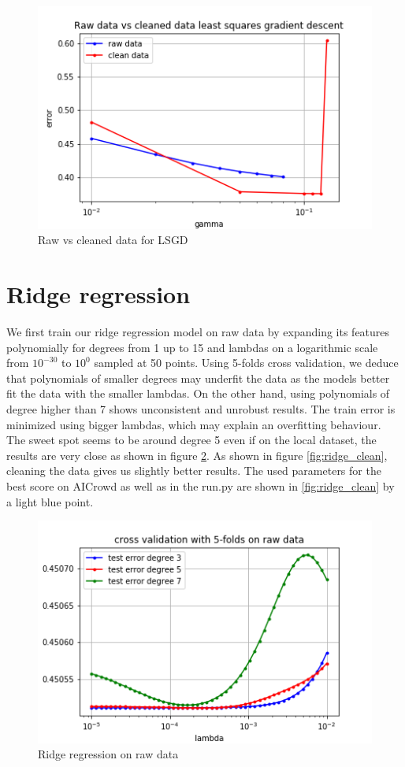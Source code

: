 \documentclass[11pt, a4paper, twocolumn]{article}
\begin{document}
\begin{figure}[h!]
  \includegraphics[width=\linewidth]{raw_vs_clean_lsgd.png}
  \caption{Raw vs cleaned data for LSGD}
    \label{fig:raw_clean_lsgd}
\end{figure}

\section{Ridge regression}
We first train our ridge regression model on raw data by
expanding its features polynomially for degrees from 1 up
to 15 and lambdas on a
logarithmic scale from $10^{-30}$ to
$10^0$ sampled at 50 points. Using 5-folds cross validation, we deduce that
polynomials of smaller degrees may underfit the data as
the models better fit the data with the smaller lambdas.
On the other hand, using polynomials of degree higher than
7 shows unconsistent and unrobust results. The train error
is minimized using bigger lambdas, which may explain an
overfitting behaviour. The sweet spot
seems to be around degree 5 even if on
the local dataset, the results are very
close  as shown in figure
\ref{fig:ridge_raw}. As shown in figure
\ref{fig:ridge_clean}, cleaning the data
gives us slightly better results. The used
parameters for the best score on AICrowd
as well as in the run.py  are shown in
\ref{fig:ridge_clean} by a light blue
point.

\begin{figure}[h!]
  \includegraphics[width=\linewidth]{plots/ridge_raw.png}
  \caption{Ridge regression on raw data}
  \label{fig:ridge_raw}
\end{figure}
\end{document}
